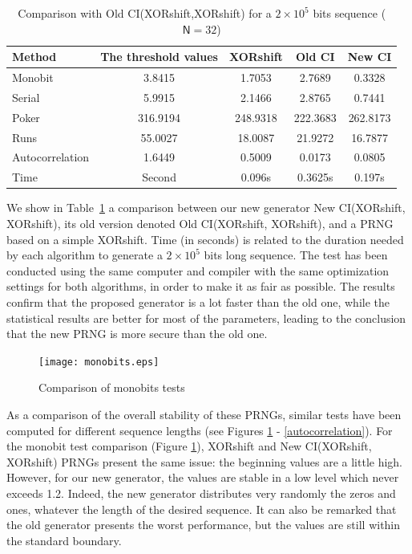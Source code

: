 \begin{table}
\renewcommand{\arraystretch}{1.3}
\caption{Comparison with Old CI(XORshift,XORshift) for a $2 \times 10^5$ bits sequence  ($\mathsf{N}=32$)}
\label{Comparison22}
\centering
  \begin{tabular}{lcccc}
    \toprule
Method &The threshold values&XORshift& Old CI& New CI \\ \hline
   
Monobit			&3.8415		&1.7053		&2.7689		&0.3328	 \\ \hline
Serial  		&5.9915		&2.1466		&2.8765		&0.7441		  \\ \hline
Poker  			&316.9194	&248.9318	&222.3683	&262.8173		 \\ \hline
Runs 			&55.0027	&18.0087	&21.9272	&16.7877	   \\ \hline
Autocorrelation		&1.6449		&0.5009		&0.0173		&0.0805		  \\ \hline
Time			&Second		&0.096s		&0.3625s	&0.197s		  \\ 
    \bottomrule
  \end{tabular}
\end{table}



We show in Table~\ref{Comparison22} a comparison between our new generator New CI(XORshift, XORshift), its old version denoted Old CI(XORshift, XORshift), and a PRNG based on a simple XORshift. Time (in seconds) is related to the duration needed by each algorithm to generate a $2 \times 10^5$ bits long sequence. The test has been conducted using the same computer and compiler with the same optimization settings for both algorithms, in order to make it as fair as possible. 
The results confirm that the proposed generator is a lot faster than the old one, while the statistical results are better for most of the parameters, leading to the conclusion that the new PRNG is more secure than the old one. %


\begin{figure}
\centering
\texttt{[image: monobits.eps]}
\caption{Comparison of monobits tests}
\label{monobits}
\end{figure}

As a comparison of the overall stability of these PRNGs, similar tests have been computed for different sequence lengths (see Figures \ref{monobits} - \ref{autocorrelation}).
For the monobit test comparison (Figure \ref{monobits}), XORshift and New CI(XORshift, XORshift) PRNGs present the same issue: the beginning values are a little high. However, for our new generator, the values are stable in a low level which never exceeds 1.2. Indeed, the new generator distributes very randomly the zeros and ones, whatever the length of the desired sequence. 
It can also be remarked that the old generator presents the worst performance, but the values are  still within the standard boundary.

